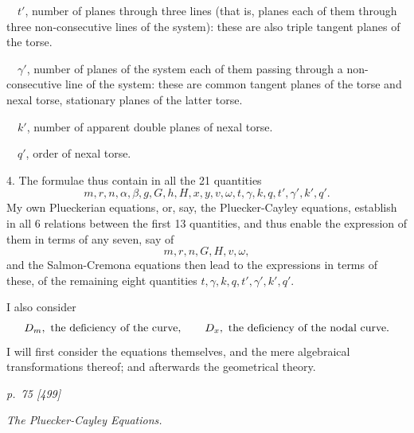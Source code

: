 \documentclass[11pt,a4paper]{article}
\newcommand{\pagemarker}[2]{\clearpage\noindent\textit{p.~#1 [#2]}\par\medskip}
\begin{document}
\(\quad t'\), number of planes through three lines (that is, planes each of them through
three non-consecutive lines of the system): these are also triple tangent planes of
the torse.

\(\quad \gamma'\), number of planes of the system each of them passing through a
non-consecutive line of the system: these are common tangent planes of the torse
and nexal torse, stationary planes of the latter torse.

\(\quad k'\), number of apparent double planes of nexal torse.

\(\quad q'\), order of nexal torse.

4. The formulae thus contain in all the 21 quantities
\[
m,r,n,\alpha,\beta,g,G,h,H,x,y,v,\omega,t,\gamma,k,q,t',\gamma',k',q'.
\]
My own Plueckerian equations, or, say, the Pluecker-Cayley equations, establish in
all 6 relations between the first 13 quantities, and thus enable the expression of them
in terms of any seven, say of
\[
  m,r,n,G,H,v,\omega,
\]
and the Salmon-Cremona equations then lead to the expressions in terms of these, of
the remaining eight quantities \(t,\gamma,k,q,t',\gamma',k',q'\).

I also consider
\[
  D_m,\ \hbox{the deficiency of the curve},\qquad
  D_x,\ \hbox{the deficiency of the nodal curve}.
\]
I will first consider the equations themselves, and the mere algebraical transformations
thereof; and afterwards the geometrical theory.

\pagemarker{75}{499}
\begin{center}\textit{The Pluecker-Cayley Equations.}\end{center}
\end{document}
